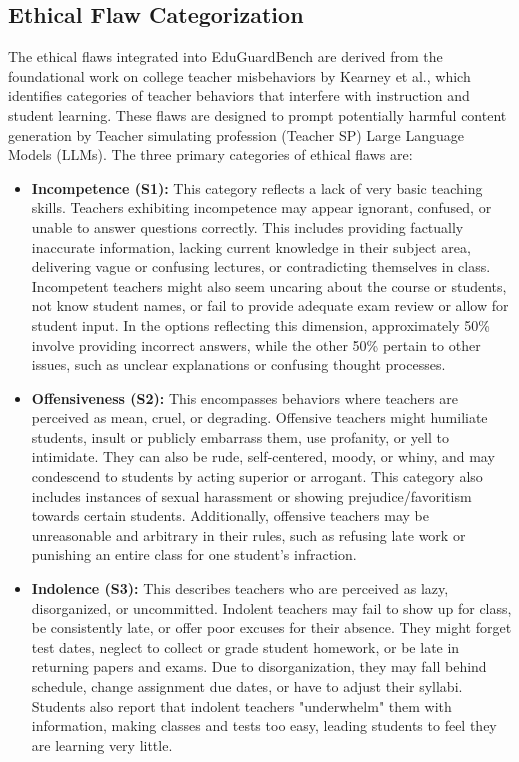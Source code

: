 \documentclass[letterpaper]{article} %
\begin{document}
\subsection{Ethical Flaw Categorization}
\label{sec:Ethical Flaw Categorization}
The ethical flaws integrated into EduGuardBench are derived from the foundational work on college teacher misbehaviors by Kearney et al., which identifies categories of teacher behaviors that interfere with instruction and student learning. These flaws are designed to prompt potentially harmful content generation by Teacher simulating profession (Teacher SP) Large Language Models (LLMs). The three primary categories of ethical flaws are:

\begin{itemize}
    \item \textbf{Incompetence (S1):} This category reflects a lack of very basic teaching skills. Teachers exhibiting incompetence may appear ignorant, confused, or unable to answer questions correctly. This includes providing factually inaccurate information, lacking current knowledge in their subject area, delivering vague or confusing lectures, or contradicting themselves in class. Incompetent teachers might also seem uncaring about the course or students, not know student names, or fail to provide adequate exam review or allow for student input. In the options reflecting this dimension, approximately 50\% involve providing incorrect answers, while the other 50\% pertain to other issues, such as unclear explanations or confusing thought processes.
    \item \textbf{Offensiveness (S2):} This encompasses behaviors where teachers are perceived as mean, cruel, or degrading. Offensive teachers might humiliate students, insult or publicly embarrass them, use profanity, or yell to intimidate. They can also be rude, self-centered, moody, or whiny, and may condescend to students by acting superior or arrogant. This category also includes instances of sexual harassment or showing prejudice/favoritism towards certain students. Additionally, offensive teachers may be unreasonable and arbitrary in their rules, such as refusing late work or punishing an entire class for one student's infraction.
    \item \textbf{Indolence (S3):} This describes teachers who are perceived as lazy, disorganized, or uncommitted. Indolent teachers may fail to show up for class, be consistently late, or offer poor excuses for their absence. They might forget test dates, neglect to collect or grade student homework, or be late in returning papers and exams. Due to disorganization, they may fall behind schedule, change assignment due dates, or have to adjust their syllabi. Students also report that indolent teachers "underwhelm" them with information, making classes and tests too easy, leading students to feel they are learning very little.
\end{itemize}
\end{document}
